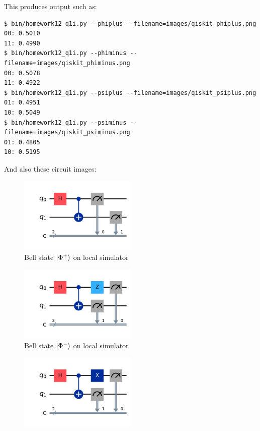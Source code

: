 \documentclass[12pt]{extarticle}
\begin{document}
\begin{enumerate}[(i)]
This produces output such as:
\begin{footnotesize}
\begin{lstlisting}
$ bin/homework12_q1i.py --phiplus --filename=images/qiskit_phiplus.png
00: 0.5010
11: 0.4990
$ bin/homework12_q1i.py --phiminus --filename=images/qiskit_phiminus.png
00: 0.5078
11: 0.4922
$ bin/homework12_q1i.py --psiplus --filename=images/qiskit_psiplus.png
01: 0.4951
10: 0.5049
$ bin/homework12_q1i.py --psiminus --filename=images/qiskit_psiminus.png
01: 0.4805
10: 0.5195
\end{lstlisting}
\end{footnotesize}

And also these circuit images:
\begin{figure}[H]
\centering
\includegraphics[width=0.50\textwidth]{images/qiskit_phiplus.png}
\caption{Bell state $\ket{\Phi^{+}}$ on local simulator}
\end{figure}
\begin{figure}[H]
\centering
\includegraphics[width=0.50\textwidth]{images/qiskit_phiminus.png}
\caption{Bell state $\ket{\Phi^{-}}$ on local simulator}
\end{figure}
\begin{figure}[H]
\centering
\includegraphics[width=0.50\textwidth]{images/qiskit_psiplus.png}

\end{figure}
\end{enumerate}
\end{document}
